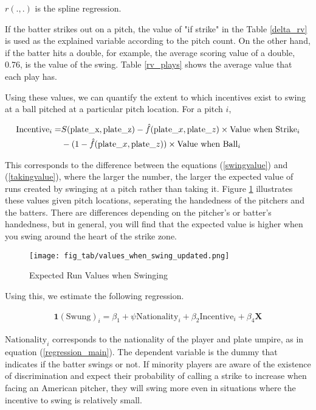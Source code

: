 \documentclass[dvipdfmx, 12pt]{jsarticle}
\begin{document}
$r(., .)$ is the spline regression.



If the batter strikes out on a pitch, the value of "if strike" in the Table \ref{delta_rv} is used as the explained variable according to the pitch count. On the other hand, if the batter hits a double, for example, the average scoring value of a double, 0.76, is the value of the swing. Table \ref{rv_plays} shows the average value that each play has.

Using these values, we can quantify the extent to which incentives exist to swing at a ball pitched at a particular pitch location. For a pitch $i$,

\begin{align}
  \text{Incentive}_i = & S(\text{plate\_x}, \text{plate\_z}) - \hat{f}(\text{plate}\_x, \text{plate}\_z) \times \text{Value when Strike}_i \notag \\
  & - (1 - \hat{f}(\text{plate}\_x, \text{plate}\_z)) \times \text{Value when Ball}_i
\end{align} 

This corresponds to the difference between the equations (\ref{swingvalue}) and (\ref{takingvalue}), where the larger the number, the larger the expected value of runs created by swinging at a pitch rather than taking it. Figure \ref{swinging_values_illustration} illustrates these values given pitch locations, seperating the handedness of the pitchers and the batters. There are differences depending on the pitcher's or batter's handedness, but in general, you will find that the expected value is higher when you swing around the heart of the strike zone.

\begin{figure}[ht]
  \centering
  \caption{Expected Run Values when Swinging}
  \texttt{[image: fig\_tab/values\_when\_swing\_updated.png]}
  \label{swinging_values_illustration}
\end{figure}

Using this, we estimate the following regression.

\begin{align}
  \mathbf{1}(\text{Swung})_i = \beta_1 + \psi \text{Nationality}_i + \beta_2 \text{Incentive}_i + \beta_4 \mathbf{X}
\end{align}

$\text{Nationality}_i$ corresponds to the nationality of the player and plate umpire, as in equation (\ref{regression_main}). The dependent variable is the dummy that indicates if the batter swings or not. If minority players are aware of the existence of discrimination and expect their probability of calling a strike to increase when facing an American pitcher, they will swing more even in situations where the incentive to swing is relatively small.
\end{document}
